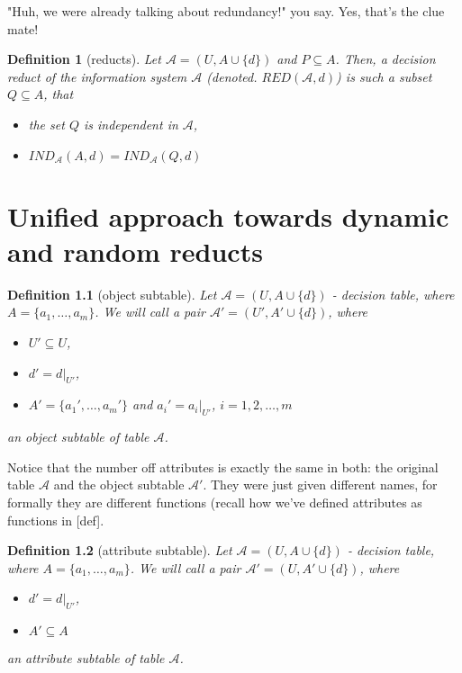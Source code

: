 \documentclass[12pt]{pracamgr}
\newtheorem{definition}{Definition}[chapter]
\begin{document}
"Huh, we were already talking about redundancy!" you say. Yes, that's the clue mate!

\begin{definition}[reducts]

  Let $\mathcal{A} = (U, A \cup \{d\})$  and $P \subseteq A$. Then, a \emph{decision reduct
  of the information system $\mathcal{A}$} (denoted. $RED(\mathcal{A}, d)$) is such a
  subset $Q \subseteq A$, that
  \begin{itemize}
    \item the set $Q$ is independent in $\mathcal{A}$,
    \item $IND_\mathcal{A}(A, d) = IND_\mathcal{A}(Q, d)$
  \end{itemize}

\end{definition}




\chapter{Unified approach towards dynamic and random reducts}
\label{chap:dynamicrandomreducts}

\begin{definition}[object subtable]

  Let $\mathcal{A} = (U, A \cup \{d\})$ - decision table, where $A = \{a_1, \dots, a_m\}$. 
  We will call a pair $\mathcal{A'}  = (U', A' \cup \{d\})$, where 
  \begin{itemize}
    \item $U' \subseteq U$,
    \item $d' = d |_{U'}$,
    \item $A' = \{a_1', \dots,  a_m'\}$ and $a_i' = a_i |_{U'}$, $i = 1, 2, \dots, m$
  \end{itemize}
  an \emph{object subtable} of table $\mathcal{A}$.
  
\end{definition}

Notice that the number off attributes is exactly the same in both: the original table $\mathcal{A}$ and the object subtable $\mathcal{A'}$. They were just given different names, 
for formally they are different functions (recall how we've defined attributes as functions
in [def].

\begin{definition}[attribute subtable]

  Let $\mathcal{A} = (U, A \cup \{d\})$ - decision table, where $A = \{a_1, \dots, a_m\}$. 
  We will call a pair $\mathcal{A'}  = (U, A' \cup \{d\})$, where 
  \begin{itemize}
    \item $d' = d |_{U'}$,
    \item $A' \subseteq A$
  \end{itemize}
  an \emph{attribute subtable} of table $\mathcal{A}$.
  
\end{definition}
\end{document}
